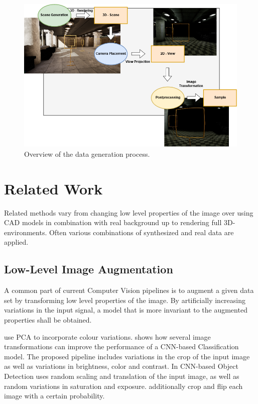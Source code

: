 \begin{figure}[htbp]
	\centering
	\includegraphics[width=\textwidth]{fig/Toolchain_datagen}
	\caption{Overview of the data generation process.}
	\label{fig:training:toolchain_datagen}
\end{figure}

\section{Related Work}
\label{sec:training:related}

Related methods vary from changing low level properties of the image over using CAD models in combination with real background up to rendering full 3D-environments. Often various combinations of synthesized and real data are applied. 

\subsection{Low-Level Image Augmentation}

A common part of current Computer Vision pipelines is to augment a given data set by transforming low level properties of the image. By artificially increasing variations in the input signal, a model that is more invariant to the augmented properties shall be obtained.

\citeauthor{Krizhevsky2012a} \cite{Krizhevsky2012a} use \ac{PCA} to incorporate colour variations. \citeauthor{Howard2013} \cite{Howard2013} shows how several image transformations can improve the performance of a \ac{CNN}-based Classification model. The proposed pipeline includes variations in the crop of the input image as well as variations in brightness, color and contrast. In \ac{CNN}-based Object Detection \citeauthor{Redmon} \cite{Redmon} uses random scaling and translation of the input image, as well as random variations in saturation and exposure. \citeauthor{Liu} \cite{Liu} additionally crop and flip each image with a certain probability.

